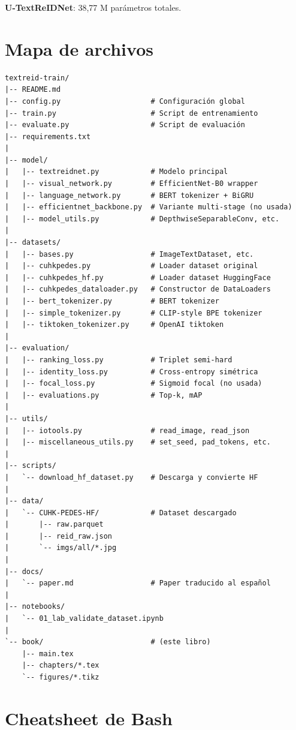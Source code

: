 \noindent\textbf{U-TextReIDNet}: 38,77 M parámetros totales.

\section{Mapa de archivos}

\begin{verbatim}
textreid-train/
|-- README.md
|-- config.py                     # Configuración global
|-- train.py                      # Script de entrenamiento
|-- evaluate.py                   # Script de evaluación
|-- requirements.txt
|
|-- model/
|   |-- textreidnet.py            # Modelo principal
|   |-- visual_network.py         # EfficientNet-B0 wrapper
|   |-- language_network.py       # BERT tokenizer + BiGRU
|   |-- efficientnet_backbone.py  # Variante multi-stage (no usada)
|   |-- model_utils.py            # DepthwiseSeparableConv, etc.
|
|-- datasets/
|   |-- bases.py                  # ImageTextDataset, etc.
|   |-- cuhkpedes.py              # Loader dataset original
|   |-- cuhkpedes_hf.py           # Loader dataset HuggingFace
|   |-- cuhkpedes_dataloader.py   # Constructor de DataLoaders
|   |-- bert_tokenizer.py         # BERT tokenizer
|   |-- simple_tokenizer.py       # CLIP-style BPE tokenizer
|   |-- tiktoken_tokenizer.py     # OpenAI tiktoken
|
|-- evaluation/
|   |-- ranking_loss.py           # Triplet semi-hard
|   |-- identity_loss.py          # Cross-entropy simétrica
|   |-- focal_loss.py             # Sigmoid focal (no usada)
|   |-- evaluations.py            # Top-k, mAP
|
|-- utils/
|   |-- iotools.py                # read_image, read_json
|   |-- miscellaneous_utils.py    # set_seed, pad_tokens, etc.
|
|-- scripts/
|   `-- download_hf_dataset.py    # Descarga y convierte HF
|
|-- data/
|   `-- CUHK-PEDES-HF/            # Dataset descargado
|       |-- raw.parquet
|       |-- reid_raw.json
|       `-- imgs/all/*.jpg
|
|-- docs/
|   `-- paper.md                  # Paper traducido al español
|
|-- notebooks/
|   `-- 01_lab_validate_dataset.ipynb
|
`-- book/                         # (este libro)
    |-- main.tex
    |-- chapters/*.tex
    `-- figures/*.tikz
\end{verbatim}

\section{Cheatsheet de Bash}

